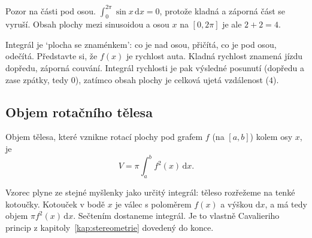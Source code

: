 \begin{example}
  Pozor na části pod osou. $\int_0^{2\pi}\sin x\,\mathrm{d}x = 0$, protože kladná a záporná část se vyruší. Obsah plochy mezi sinusoidou a osou $x$ na $[0, 2\pi]$ je ale $2 + 2 = 4$.

  \begin{center}
  \end{center}
  Integrál je `plocha se znaménkem': co je nad osou, přičítá, co je pod osou, odečítá. Představte si, že $f(x)$ je rychlost auta. Kladná rychlost znamená jízdu dopředu, záporná couvání. Integrál rychlosti je pak výsledné posunutí (dopředu a zase zpátky, tedy $0$), zatímco obsah plochy je celková ujetá vzdálenost ($4$).
\end{example}

\subsection{Objem rotačního tělesa}\label{sec:objem-rotacniho}

\begin{definitionbox}
  Objem tělesa, které vznikne rotací plochy pod grafem $f$ (na $[a, b]$) kolem osy $x$, je
  \begin{equation*}
    V = \pi\int_a^b f^2(x)\,\mathrm{d}x.
  \end{equation*}
\end{definitionbox}

Vzorec plyne ze stejné myšlenky jako určitý integrál: těleso rozřežeme na tenké kotoučky. Kotouček v bodě $x$ je válec s poloměrem $f(x)$ a výškou $\mathrm{d}x$, a má tedy objem $\pi f^2(x)\,\mathrm{d}x$. Sečtením dostaneme integrál. Je to vlastně Cavalieriho princip z kapitoly~\ref{kap:stereometrie} dovedený do konce.

